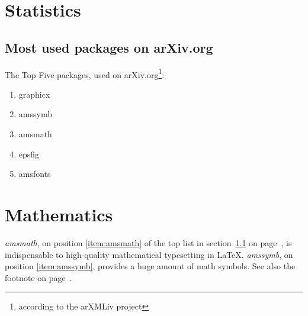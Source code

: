 \documentclass{book}
\begin{document}
\chapter{Statistics}
\section{Most used packages on arXiv.org}\label{sec:packages}
The Top Five packages, used on arXiv.org\footnote{according
to the arXMLiv project\label{fn:project}}:
\begin{enumerate}
  \item graphicx
  \item amssymb \label{item:amssymb}
  \item amsmath \label{item:amsmath}
  \item epsfig
  \item amsfonts
\end{enumerate}
\chapter{Mathematics}
\emph{amsmath}, on position \ref{item:amsmath} of the top list
in section~\ref{sec:packages} on page~\pageref{sec:packages},
is indispensable to high-quality mathematical typesetting in
\LaTeX. \emph{amssymb}, on position \ref{item:amssymb},
provides a huge amount of math symbols.
See also the footnote on page~\pageref{fn:project}.
\end{document}
